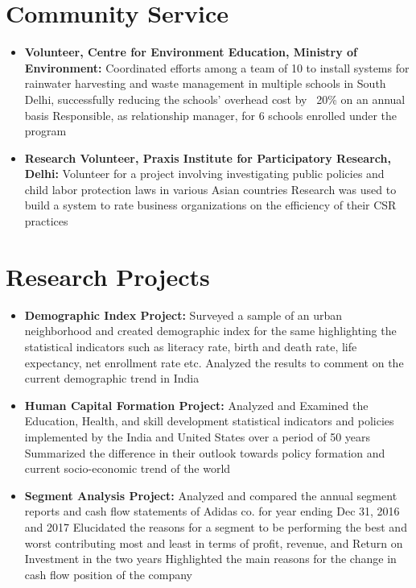 \documentclass[letterpaper,10pt]{article}
\newcommand{\resumeSubHeadingListStart}{\begin{itemize}[leftmargin=*]}
\newcommand{\resumeSubHeadingListEnd}{\end{itemize}}
\newcommand{\shorterSection}[1]{\vspace{-10pt}\section{#1}}
\begin{document}
\shorterSection{Community Service}
  \resumeSubHeadingListStart
  \small
    \item{
    \textbf{Volunteer, Centre for Environment Education, Ministry of Environment:}\newline
    {Coordinated efforts among a team of 10 to install systems for rainwater harvesting and waste management in multiple
    schools in South Delhi, successfully reducing the schools' overhead cost by ~20\% on an annual basis}\newline
    {Responsible, as relationship manager, for 6 schools enrolled under the program}
     \hfill}
    \vspace{-5pt}
    \item{
    \textbf{Research Volunteer, Praxis Institute for Participatory Research, Delhi:}\newline
    {Volunteer for a project involving investigating public policies and child labor protection laws in various Asian countries}\newline
    {Research was used to build a system to rate business organizations on the efficiency of their CSR practices}
    }
  \resumeSubHeadingListEnd
  
\shorterSection{Research Projects}
  \resumeSubHeadingListStart
  \small
    \item{
    \textbf{Demographic Index Project:}\newline
    {Surveyed a sample of an urban neighborhood and created demographic index for the same highlighting the statistical indicators
    such as literacy rate, birth and death rate, life expectancy, net enrollment rate etc.}\newline
    {Analyzed the results to comment on the current demographic trend in India}
    \hfill}
    \vspace{-5pt}
    \item{
    \textbf{Human Capital Formation Project:}\newline
    {Analyzed and Examined the Education, Health, and skill development statistical indicators and policies
    implemented by the India and United States over a period of 50 years}\newline
    {Summarized the difference in their outlook towards policy formation and current socio-economic trend of the world}
    \hfill}
    \vspace{-5pt}
    \item{
    \textbf{Segment Analysis Project:}\newline
    {Analyzed and compared the annual segment reports and cash flow statements of Adidas co. for year ending Dec 31, 2016 and 2017}\newline
    {Elucidated the reasons for a segment to be performing the best and worst contributing most and least in terms of profit, revenue,
    and Return on Investment in the two years}\newline
    {Highlighted the main reasons for the change in cash flow position of the company}
     }
  \resumeSubHeadingListEnd
\end{document}

